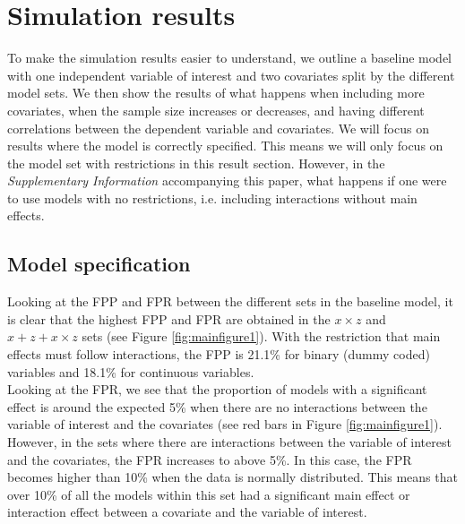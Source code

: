 \section{Simulation results} 
To make the simulation results easier to understand, we outline a baseline model with one independent variable of interest and two covariates split by the different model sets. We then show the results of what happens when including more covariates, when the sample size increases or decreases, and having different correlations between the dependent variable and covariates. We will focus on results where the model is correctly specified. This means we will only focus on the model set with restrictions in this result section. However, in the \textit{Supplementary Information} accompanying this paper, what happens if one were to use models with no restrictions, i.e. including interactions without main effects. 

\subsection{Model specification}
Looking at the FPP and FPR between the different sets in the baseline model, it is clear that the highest FPP and FPR are obtained in the $x \times z$ and $x + z+ x \times z$ sets (see Figure \ref{fig:mainfigure1}). With the restriction that main effects must follow interactions, the FPP is 21.1\% for binary (dummy coded) variables and 18.1\% for continuous variables. \\ 
Looking at the FPR, we see that the proportion of models with a significant effect is around the expected 5\% when there are no interactions between the variable of interest and the covariates (see red bars in Figure \ref{fig:mainfigure1}). However, in the sets where there are interactions between the variable of interest and the covariates, the FPR increases to above 5\%. In this case, the FPR becomes higher than 10\% when the data is normally distributed. This means that over 10\% of all the models within this set had a significant main effect or interaction effect between a covariate and the variable of interest. 
 \\

